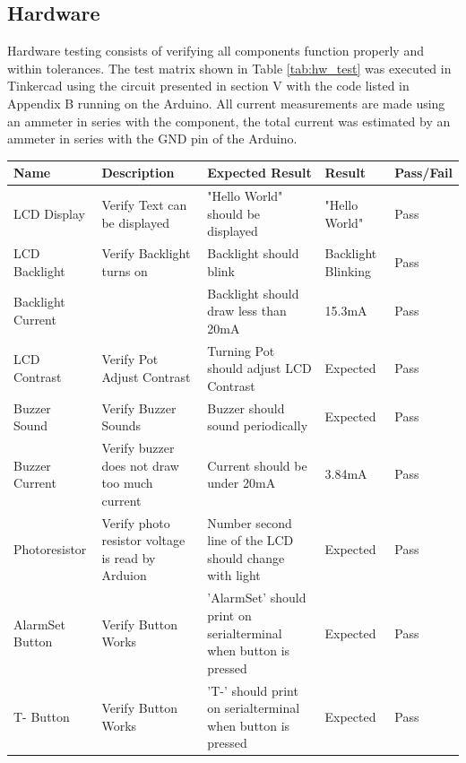 \documentclass{article}
\begin{document}
\begin{landscape}
\thispagestyle{empty}

\subsection{Hardware}
Hardware testing consists of verifying all components function properly and within tolerances. The test matrix shown in Table \ref{tab:hw_test} was executed in Tinkercad using the circuit presented in section V with the code listed in Appendix B running on the Arduino. All current measurements are made using an ammeter in series with the component, the total current was estimated by an ammeter in series with the GND pin of the Arduino.

\begin{table}[h!]
    \centering
    \begin{tabular}{|p{}|p{}|p{}|p{}|p{}|}
    \hline
       Name & Description & Expected Result & Result & Pass/Fail\\
       \hline
       LCD Display& Verify Text can be displayed&"Hello World" should be displayed&"Hello World"&Pass\\\hline
       LCD Backlight& Verify Backlight turns on& Backlight should blink&Backlight Blinking&Pass\\\hline
       Backlight Current& & Backlight should draw less than 20mA & 15.3mA & Pass\\\hline
       LCD Contrast& Verify Pot Adjust Contrast& Turning Pot should adjust LCD Contrast& Expected& Pass\\\hline
       Buzzer Sound& Verify Buzzer Sounds &Buzzer should sound periodically& Expected& Pass\\  \hline
       Buzzer Current& Verify buzzer does not draw too much current& Current should be under 20mA& 3.84mA& Pass\\\hline
       Photoresistor& Verify photo resistor voltage is read by Arduion& Number second line of the LCD should change with light & Expected & Pass\\\hline
       AlarmSet \newline Button& Verify Button Works& 'AlarmSet' should print on serial\newline terminal when button is pressed &Expected & Pass\\\hline
       T- Button& Verify Button Works& 'T-' should print on serial\newline terminal when button is pressed &Expected & Pass\\\hline

\end{tabular}
\end{table}
\end{landscape}
\end{document}
